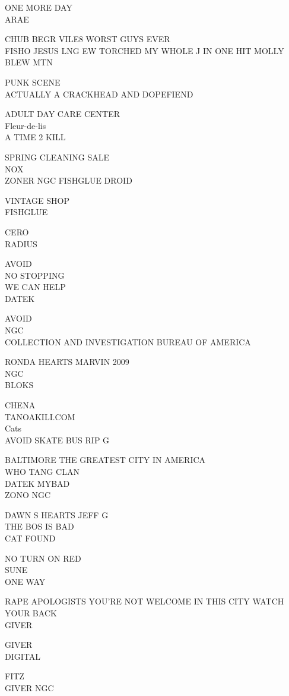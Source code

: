 \documentclass[10pt,letterpaper]{article}
\begin{document}
ONE MORE DAY\\
ARAE

CHUB BEGR VILE8 WORST GUYS EVER\\
FISHO JESUS LNG EW TORCHED MY WHOLE J IN ONE HIT MOLLY BLEW MTN

PUNK SCENE\\
ACTUALLY A CRACKHEAD AND DOPEFIEND

ADULT DAY CARE CENTER\\
Fleur{-}de{-}lis\\
A TIME 2 KILL

SPRING CLEANING SALE\\
NOX\\
ZONER NGC FISHGLUE DROID

VINTAGE SHOP\\
FISHGLUE

CERO\\
RADIUS

AVOID\\
NO STOPPING\\
WE CAN HELP\\
DATEK

AVOID\\
NGC\\
COLLECTION AND INVESTIGATION BUREAU OF AMERICA

RONDA HEARTS MARVIN 2009\\
NGC\\
BLOKS

CHENA\\
TANOAKILI.COM\\
Cats\\
AVOID SKATE BUS RIP G

BALTIMORE THE GREATEST CITY IN AMERICA\\
WHO TANG CLAN\\
DATEK MYBAD\\
ZONO NGC

DAWN S HEARTS JEFF G\\
THE BOS IS BAD\\
CAT FOUND

NO TURN ON RED\\
SUNE\\
ONE WAY

RAPE APOLOGISTS YOU'RE NOT WELCOME IN THIS CITY WATCH YOUR BACK\\
GIVER

GIVER\\
DIGITAL

FITZ\\
GIVER NGC
\end{document}
